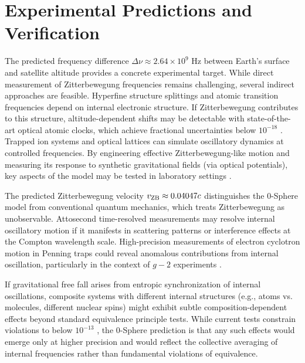 \documentclass[%
 reprint,
 amsmath,amssymb,
 aps,
 prb,
]{revtex4-2}
\numberwithin{equation}{section}
\begin{document}
\section{Experimental Predictions and Verification}
\label{sec:experimental}

The predicted frequency difference $\Delta\nu \approx 2.64 \times 10^9$ Hz between Earth's surface and satellite altitude provides a concrete experimental target. While direct measurement of Zitterbewegung frequencies remains challenging, several indirect approaches are feasible. Hyperfine structure splittings and atomic transition frequencies depend on internal electronic structure. If Zitterbewegung contributes to this structure, altitude-dependent shifts may be detectable with state-of-the-art optical atomic clocks, which achieve fractional uncertainties below $10^{-18}$ \cite{Ludlow2015}. Trapped ion systems and optical lattices can simulate oscillatory dynamics at controlled frequencies. By engineering effective Zitterbewegung-like motion and measuring its response to synthetic gravitational fields (via optical potentials), key aspects of the model may be tested in laboratory settings \cite{Gerritsma2010}.

The predicted Zitterbewegung velocity $v_{\rm ZB} \approx 0.04047c$ distinguishes the 0-Sphere model from conventional quantum mechanics, which treats Zitterbewegung as unobservable. Attosecond time-resolved measurements may resolve internal oscillatory motion if it manifests in scattering patterns or interference effects at the Compton wavelength scale. High-precision measurements of electron cyclotron motion in Penning traps could reveal anomalous contributions from internal oscillation, particularly in the context of $g-2$ experiments \cite{Gabrielse2023}.

If gravitational free fall arises from entropic synchronization of internal oscillations, composite systems with different internal structures (e.g., atoms vs. molecules, different nuclear spins) might exhibit subtle composition-dependent effects beyond standard equivalence principle tests. While current tests constrain violations to below $10^{-13}$ \cite{Touboul2017}, the 0-Sphere prediction is that any such effects would emerge only at higher precision and would reflect the collective averaging of internal frequencies rather than fundamental violations of equivalence.
\end{document}
